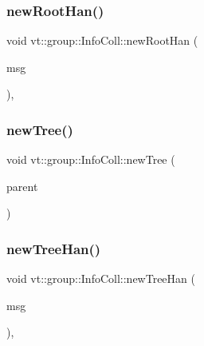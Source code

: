 \mbox{\label{structvt_1_1group_1_1_info_coll_a1c37f69107e014a3aef10346e5ebe0c7}} 
\subsubsection{\texorpdfstring{new\+Root\+Han()}{newRootHan()}}
{\footnotesize\ttfamily void vt\+::group\+::\+Info\+Coll\+::new\+Root\+Han (\begin{DoxyParamCaption}\item[{\hyperlink{namespacevt_1_1group_a4c1183efe0185992fefb3ab38a55a8a7}{Group\+Collective\+Msg} $\ast$}]{msg }\end{DoxyParamCaption})\hspace{0.3cm}{\ttfamily [static]}, {\ttfamily [protected]}}

\mbox{\label{structvt_1_1group_1_1_info_coll_aea685940e7c9f1e18d55bfab07e31445}} 
\subsubsection{\texorpdfstring{new\+Tree()}{newTree()}}
{\footnotesize\ttfamily void vt\+::group\+::\+Info\+Coll\+::new\+Tree (\begin{DoxyParamCaption}\item[{\hyperlink{namespacevt_a866da9d0efc19c0a1ce79e9e492f47e2}{Node\+Type} const \&}]{parent }\end{DoxyParamCaption})\hspace{0.3cm}{\ttfamily [private]}}

\mbox{\label{structvt_1_1group_1_1_info_coll_ac0054acdfecccf525613a95997d79e20}} 
\subsubsection{\texorpdfstring{new\+Tree\+Han()}{newTreeHan()}}
{\footnotesize\ttfamily void vt\+::group\+::\+Info\+Coll\+::new\+Tree\+Han (\begin{DoxyParamCaption}\item[{\hyperlink{namespacevt_1_1group_a864fcf6bc821eacf8350bf4ad15e51b3}{Group\+Only\+Msg} $\ast$}]{msg }\end{DoxyParamCaption})\hspace{0.3cm}{\ttfamily [static]}, {\ttfamily [protected]}}

